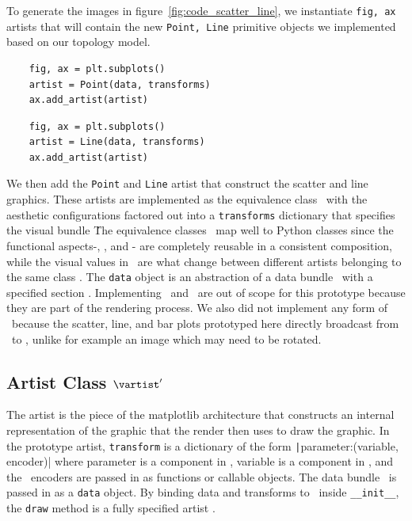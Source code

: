 \documentclass[../main.tex]{subfiles}
\begin{document}
To generate the images in figure~\ref{fig:code_scatter_line}, we instantiate \texttt{fig, ax} artists that will contain the new \texttt{Point, Line} primitive objects we implemented based on our topology model. 

\begin{multicols*}{2}
\begin{verbatim}
    fig, ax = plt.subplots()
    artist = Point(data, transforms)
    ax.add_artist(artist)
\end{verbatim}
\columnbreak
\begin{verbatim}
    fig, ax = plt.subplots()
    artist = Line(data, transforms)
    ax.add_artist(artist)
\end{verbatim}
\end{multicols*}

We then add the \texttt{Point} and \texttt{Line} artist that construct the scatter and line graphics. These artists are implemented as the equivalence class \vartisteq\ with the aesthetic configurations factored out into a \texttt{transforms} dictionary that specifies the visual bundle \vtotal\. The equivalence classes \vartisteq\ map well to Python classes since the functional aspects-\vchannel, \vmarkd, and \vindex - are completely reusable in a consistent composition, while the visual values in \vtotal\ are what change between different artists belonging to the same class \vartisteq. The \texttt{data} object is an abstraction of a data bundle \dtotal\ with a specified section \dsection. Implementing \gtotal\ and \gsection\ are out of scope for this prototype because they are part of the rendering process. We also did not implement any form of \vindex\ because the scatter, line, and bar plots prototyped here directly broadcast from \dbasepoint\ to \gbasepoint, unlike for example an image which may need to be rotated. 
 
\subsection{Artist Class $\vartist^{\prime}$}
\label{sec:code_artist}
The artist is the piece of the matplotlib architecture that constructs an internal representation of the graphic that the render then uses to draw the graphic. In the prototype artist, \texttt{transform} is a dictionary of the form \texttt|{parameter:(variable, encoder)}| where parameter is a component in \vfiber, variable is a component in \dfiber,  and the \vchannel\ encoders are passed in as functions or callable objects. The data bundle \dtotal\ is passed in as a \texttt{data} object. By binding data and transforms to \vartisteq\ inside \texttt{__init__}, the \texttt{draw} method is a fully specified artist \vartist.
\end{document}
